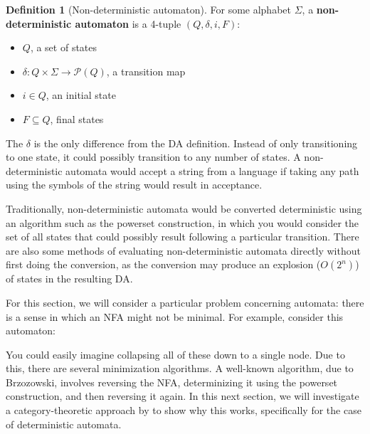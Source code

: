 \documentclass{article}
\theoremstyle{plain}
\theoremstyle{definition}
\newtheorem{definition}{Definition}
\begin{document}
\begin{definition}[Non-deterministic automaton]
 For some alphabet \ensuremath{\Sigma}, a \textbf{non-deterministic automaton} is a 4-tuple \ensuremath{\left( Q, \delta , i, F \right)}: \begin{itemize}
\item \ensuremath{Q}, a set of states
\item \ensuremath{\delta : Q \times \Sigma \rightarrow \mathcal{P}\left( Q \right)}, a transition map
\item \ensuremath{i \in Q}, an initial state
\item \ensuremath{F \subseteq Q}, final states
\end{itemize}

\end{definition}


The \ensuremath{\delta} is the only difference from the DA definition. Instead of only transitioning to one state, it could possibly transition to any number of states. A non-deterministic automata would accept a string from a language if taking any path using the symbols of the string would result in acceptance.

Traditionally, non-deterministic automata would be converted deterministic using an algorithm such as the powerset construction, in which you would consider the set of all states that could possibly result following a particular transition. There are also some methods of evaluating non-deterministic automata directly without first doing the conversion, as the conversion may produce an explosion (\ensuremath{O\left( {2}^{n} \right)}) of states in the resulting DA.

For this section, we will consider a particular problem concerning automata: there is a sense in which an NFA might not be minimal. For example, consider this automaton:


\begin{center}
\end{center}


You could easily imagine collapsing all of these down to a single node. Due to this, there are several minimization algorithms. A well-known algorithm, due to Brzozowski, involves reversing the NFA, determinizing it using the powerset construction, and then reversing it again. In this next section, we will investigate a category-theoretic approach by \cite{bonchiAlgebracoalgebraDualityBrzozowskis2014} to show why this works, specifically for the case of deterministic automata.
\end{document}
